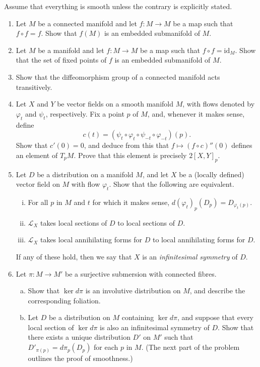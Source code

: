 \documentclass[11pt]{article} %
\begin{document}
Assume that everything is smooth unless the contrary is explicitly stated.

\begin{enumerate}
	\item Let $M$ be a connected manifold and let $f\colon M \to M$ be a map such that $f \circ f = f$. Show that $f(M)$ is an embedded submanifold of $M$. 

	\item Let $M$ be a manifold and let $f\colon M \to M$ be a map such that $f \circ f = \mathrm{id}_M$. Show that the set of fixed points of $f$ is an embedded submanifold of $M$.

	\item Show that the diffeomorphism group of a connected manifold acts transitively.

	\item Let $X$ and $Y$ be vector fields on a smooth manifold $M$, with flows denoted by $\varphi_t$ and $\psi_t$, respectively. Fix a point $p$ of $M$, and, whenever it makes sense, define
	\[
		c(t) = (\psi_t \circ \varphi_t \circ \psi_{-t} \circ \varphi_{-t})(p).
	\]
	Show that $c'(0) = 0$, and deduce from this that $f \mapsto (f \circ c)''(0)$ defines an element of $T_pM$. Prove that this element is precisely $2[X, Y]_p$.

	\item Let $D$ be a distribution on a manifold $M$, and let $X$ be a (locally defined) vector field on $M$ with flow $\varphi_t$. Show that the following are equivalent.
	\begin{enumerate}[(i)]
		\item For all $p$ in $M$ and $t$ for which it makes sense, $d(\varphi_t)_p(D_p) = D_{\varphi_t(p)}$.
		\item $\mathcal{L}_X$ takes local sections of $D$ to local sections of $D$.
		\item $\mathcal{L}_X$ takes local annihilating forms for $D$ to local annihilating forms for $D$.
	\end{enumerate}
	If any of these hold, then we say that $X$ is an \emph{infinitesimal symmetry} of $D$.

	\item Let $\pi\colon M \to M'$ be a surjective submersion with connected fibres.
	\begin{enumerate}[(a)]
		\item Show that $\ker d\pi$ is an involutive distribution on $M$, and describe the corresponding foliation.
		\item Let $D$ be a distribution on $M$ containing $\ker d\pi$, and suppose that every local section of $\ker d\pi$ is also an infinitesimal symmetry of $D$. Show that there exists a unique distribution $D'$ on $M'$ such that $D'_{\pi(p)} = d\pi_p(D_p)$ for each $p$ in $M$. (The next part of the problem outlines the proof of smoothness.)


\end{enumerate}
\end{enumerate}
\end{document}
